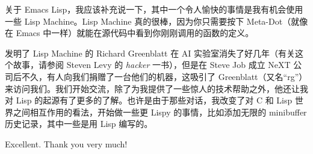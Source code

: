 \documentclass[format=acmsmall,screen]{acmart}
\begin{document}
关于 Emacs Lisp，我应该补充说一下，其中一个令人愉快的事情是我有机会使用一些 Lisp Machine。Lisp Machine 真的很棒，因为你只需要按下 Meta-Dot（就像在 Emacs 中一样）就能在源代码中看到你刚刚调用的函数的定义。

发明了 Lisp Machine 的 Richard Greenblatt 在 AI 实验室消失了好几年（有关这个故事，请参阅 Steven Levy 的 \textit{hacker} 一书），但是在 Steve Job 成立 NeXT 公司后不久，有人向我们捐赠了一台他们的机器，这吸引了 Greenblatt（又名“rg”）来访问我们。我们开始交流，除了为我提供了一些惊人的技术帮助之外，他还让我对 Lisp 的起源有了更多的了解。也许是由于那些对话，我改变了对 C 和 Lisp 世界之间相互作用的看法，开始做一些更 Lispy 的事情，比如添加无限的 minibuffer 历史记录，其中一些是用 Lisp 编写的。
\begin{question}
Excellent.  Thank you very much!
\end{question}



\end{document}

